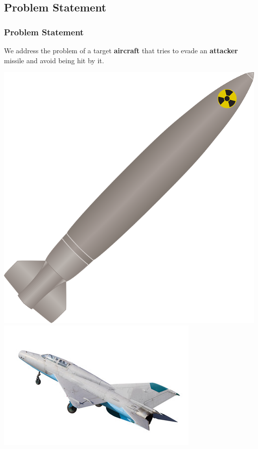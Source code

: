 \documentclass{beamer}
\begin{document}
\subsection{Problem Statement} 
\begin{frame}
\frametitle{Problem Statement}
We address the problem of a target \textbf{aircraft} that tries to evade an \textbf{attacker} missile and avoid being hit by it.\bigskip

\centering\includegraphics[height=0.25\textheight]{fig/m}  \quad
\centering\includegraphics[height=0.45\textheight]{fig/t.jpg} 

\end{frame}
\end{document}
